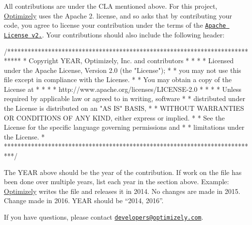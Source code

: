 All contributions are under the C\+LA mentioned above. For this project, \mbox{\hyperlink{interface_optimizely}{Optimizely}} uses the Apache 2. license, and so asks that by contributing your code, you agree to license your contribution under the terms of the \href{http://www.apache.org/licenses/LICENSE-2.0}{\tt Apache License v2.}. Your contributions should also include the following header\+:


\begin{DoxyCode}
/****************************************************************************
 * Copyright YEAR, Optimizely, Inc. and contributors                        *
 *                                                                          *
 * Licensed under the Apache License, Version 2.0 (the "License");          *
 * you may not use this file except in compliance with the License.         *
 * You may obtain a copy of the License at                                  *
 *                                                                          *
 *    http://www.apache.org/licenses/LICENSE-2.0                            *
 *                                                                          *
 * Unless required by applicable law or agreed to in writing, software      *
 * distributed under the License is distributed on an "AS IS" BASIS,        *
 * WITHOUT WARRANTIES OR CONDITIONS OF ANY KIND, either express or implied. *
 * See the License for the specific language governing permissions and      *
 * limitations under the License.                                           *
 ***************************************************************************/
\end{DoxyCode}


The Y\+E\+AR above should be the year of the contribution. If work on the file has been done over multiple years, list each year in the section above. Example\+: \mbox{\hyperlink{interface_optimizely}{Optimizely}} writes the file and releases it in 2014. No changes are made in 2015. Change made in 2016. Y\+E\+AR should be “2014, 2016”.

If you have questions, please contact \href{mailto:developers@optimizely.com}{\tt developers@optimizely.\+com}. 